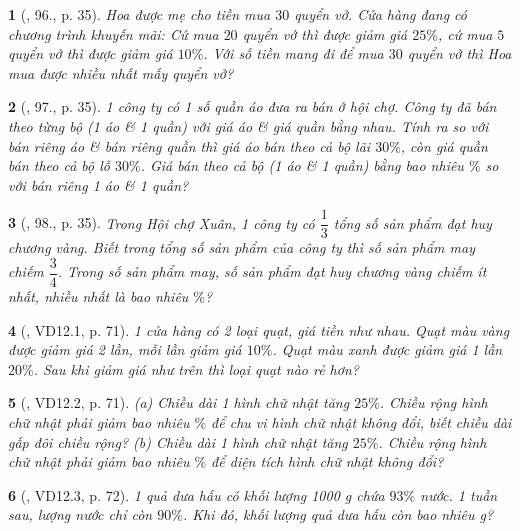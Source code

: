 \documentclass{article}
\newtheorem{baitoan}{}
\begin{document}
\begin{baitoan}[\cite{Binh_Toan_6_tap_2}, 96., p. 35]
	Hoa được mẹ cho tiền mua $30$ quyển vở. Cửa hàng đang có chương trình khuyến mãi: Cứ mua $20$ quyển vở thì được giảm giá $25\%$, cứ mua $5$ quyển vở thì được giảm giá $10\%$. Với số tiền mang đi để mua $30$ quyển vở thì Hoa mua được nhiều nhất mấy quyển vở?
\end{baitoan}

\begin{baitoan}[\cite{Binh_Toan_6_tap_2}, 97., p. 35]
	1 công ty có 1 số quần áo đưa ra bán ở hội chợ. Công ty đã bán theo từng bộ (1 áo \& 1 quần) với giá áo \& giá quần bằng nhau. Tính ra so với bán riêng áo \& bán riêng quần thì giá áo bán theo cả bộ lãi $30\%$, còn giá quần bán theo cả bộ lỗ $30\%$. Giá bán theo cả bộ (1 áo \& 1 quần) bằng bao nhiêu $\%$ so với bán riêng 1 áo \& 1 quần?
\end{baitoan}

\begin{baitoan}[\cite{Binh_Toan_6_tap_2}, 98., p. 35]
	Trong Hội chợ Xuân, 1 công ty có $\dfrac{1}{3}$ tổng số sản phẩm đạt huy chương vàng. Biết trong tổng số sản phẩm của công ty thì số sản phẩm may chiếm $\dfrac{3}{4}$. Trong số sản phẩm may, số sản phẩm đạt huy chương vàng chiếm ít nhất, nhiều nhất là bao nhiêu $\%$?
\end{baitoan}

\begin{baitoan}[\cite{TLCT_THCS_Toan_6_so_hoc}, VD12.1, p. 71]
	1 cửa hàng có 2 loại quạt, giá tiền như nhau. Quạt màu vàng được giảm giá 2 lần, mỗi lần giảm giá $10\%$. Quạt màu xanh được giảm giá 1 lần $20\%$. Sau khi giảm giá như trên thì loại quạt nào rẻ hơn?
\end{baitoan}

\begin{baitoan}[\cite{TLCT_THCS_Toan_6_so_hoc}, VD12.2, p. 71]
	(a) Chiều dài 1 hình chữ nhật tăng $25\%$. Chiều rộng hình chữ nhật phải giảm bao nhiêu $\%$ để chu vi hình chữ nhật không đổi, biết chiều dài gấp đôi chiều rộng? (b) Chiều dài 1 hình chữ nhật tăng $25\%$. Chiều rộng hình chữ nhật phải giảm bao nhiêu $\%$ để diện tích hình chữ nhật không đổi?
\end{baitoan}

\begin{baitoan}[\cite{TLCT_THCS_Toan_6_so_hoc}, VD12.3, p. 72]
	1 quả dưa hấu có khối lượng {\rm1000 g} chứa $93\%$ nước. 1 tuần sau, lượng nước chỉ còn $90\%$. Khi đó, khối lượng quả dưa hấu còn bao nhiêu {\rm g}?
\end{baitoan}
\end{document}
